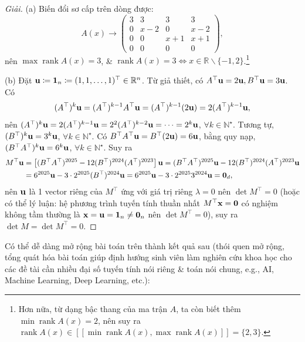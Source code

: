 \documentclass{article}
\begin{document}
\begin{proof}[Giải]
	(a) Biến đổi sơ cấp trên dòng được:
	\begin{equation*}
		A(x)\to\begin{pmatrix}
			3 & 3 & 3 & 3\\0 & x - 2 & 0 & x - 2\\0 & 0 & x + 1 & x + 1\\0 & 0 & 0 & 0
		\end{pmatrix},
	\end{equation*}
	nên $\max\operatorname{rank}A(x) = 3$, \& $\operatorname{rank}A(x) = 3\Leftrightarrow x\in\mathbb{R}\backslash\{-1,2\}$.\footnote{Hơn nữa, từ dạng bậc thang của ma trận $A$, ta còn biết thêm $\min\operatorname{rank}A(x) = 2$, nên suy ra $\operatorname{rank}A(x)\in[[\min\operatorname{rank}A(x),\max\operatorname{rank}A(x)]] = \{2,3\}$.}
	\item(b) Đặt ${\bf u}\coloneqq{\bf1}_n\coloneqq(1,1,\ldots,1)^\top\in\mathbb{R}^n$. Từ giả thiết, có $A^\top{\bf u} = 2{\bf u},B^\top{\bf u} = 3{\bf u}$. Có
	\begin{equation*}
		(A^\top)^k{\bf u} = (A^\top)^{k-1}A^\top{\bf u} = (A^\top)^{k-1}(2{\bf u}) = 2(A^\top)^{k-1}{\bf u},
	\end{equation*}
	nên $(A^\top)^k{\bf u} = 2(A^\top)^{k-1}{\bf u} = 2^2(A^\top)^{k-2}{\bf u} = \cdots = 2^k{\bf u}$, $\forall k\in\mathbb{N}^\star$. Tương tự, $(B^\top)^k{\bf u} = 3^k{\bf u}$, $\forall k\in\mathbb{N}^\star$. Có $B^\top A^\top{\bf u} = B^\top(2{\bf u}) = 6{\bf u}$, bằng quy nạp, $(B^\top A^\top)^k{\bf u} = 6^k{\bf u}$, $\forall k\in\mathbb{N}^\star$. Suy ra
	\begin{align*}
		M^\top{\bf u} &= \left[(B^\top A^\top)^{2025} - 12(B^\top)^{2024}(A^\top)^{2023}\right]{\bf u} = (B^\top A^\top)^{2025}{\bf u} - 12(B^\top)^{2024}(A^\top)^{2023}{\bf u}\\
		&= 6^{2025}{\bf u} - 3\cdot2^{2025}(B^\top)^{2024}{\bf u} = 6^{2025}{\bf u} - 3\cdot2^{2025}3^{2024}{\bf u} = {\bf0}_d,
	\end{align*}
	nên ${\bf u}$ là 1 vector riêng của $M^\top$ ứng với giá trị riêng $\lambda = 0$ nên $\det M^\top = 0$ (hoặc có thể lý luận: hệ phương trình tuyến tính thuần nhất $M^\top{\bf x} = {\bf0}$ có nghiệm không tầm thường là ${\bf x} = {\bf u} = {\bf1}_n\ne{\bf0}_n$ nên $\det M^\top = 0$), suy ra $\det M = \det M^\top = 0$.
\end{proof}
Có thể dễ dàng mở rộng bài toán trên thành kết quả sau (thói quen mở rộng, tổng quát hóa bài toán giúp định hướng sinh viên làm nghiên cứu khoa học cho các đề tài cần nhiều đại số tuyến tính nói riêng \& toán nói chung, e.g., AI, Machine Learning, Deep Learning, etc.):
\end{document}

